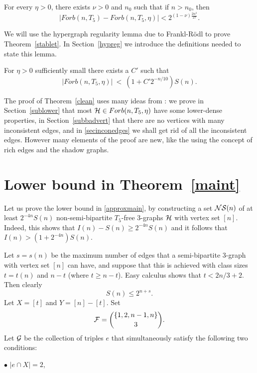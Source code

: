 \documentclass[11pt]{article}
\begin{document}
\begin{theorem} \label{stablet}
For every $\eta>0$, there exists $\nu>0$ and $n_0$ such that
 if $n>n_0$, then $$|Forb(n,T_5) - Forb(n, T_5, \eta)|<2^{(1-\nu)\frac{2n^3}{27}}.$$
\end{theorem}

 We will use the hypergraph regularity lemma due
to Frankl-R\"odl to prove Theorem~\ref{stablet}. In
Section~\ref{hypreg} we introduce the definitions needed to state
this lemma.

\begin{theorem} \label{clean}
For $\eta>0$ sufficiently small there exists a $C'$ such that
\begin{equation}\label{cleanin}|Forb(n, T_5, \eta)|\ <\ (1+C'2^{-n/10}) S(n).\end{equation}
\end{theorem}

The proof of Theorem~\ref{clean} uses many ideas from
\cite{BBS1,BBS2}: we prove in Section~\ref{sublower}  that most $\mathcal{H}\in Forb(n,
T_5, \eta)$ have some lower-dense properties, in Section~\ref{subbadvert} that
there are no vertices with many inconsistent edges, and in \ref{secinconedges} we
shall get rid of  all the inconsistent edges. However many elements
of the proof are new, like the using the concept of rich
 edges and the shadow graphs.



\section{Lower bound in Theorem~\ref{maint}}\label{lower}

Let us prove the lower bound in \eqref{approxmain},  by constructing a set $\mathcal{N}\mathcal{S}(n)$ of at least $2^{-4n}S(n)$ non-semi-bipartite
$T_5$-free 3-graphs $\mathcal{H}$ with vertex set $[n]$.  Indeed, this shows that $I(n)-S(n) \ge 2^{-4n}S(n)$ and it follows that $I(n)>(1+2^{-4n})S(n)$.

  Let $s=s(n)$ be the maximum number of
edges that a semi-bipartite 3-graph with vertex set $[n]$ can have, and suppose that this is achieved with class sizes
$t=t(n)$ and $n-t$ (where $t \ge n-t$). Easy calculus shows that $t<2n/3 +2$. Then clearly $$S(n)\le 2^{n+s}.$$
 Let $X=[t]$ and $Y= [n]-[t]$. Set
$${\cal F}= {\{1,2,n-1, n\}\choose 3}.$$
Let $\cal G$ be the collection of triples $e$ that simultaneously satisfy the following two conditions:

$\bullet$ $|e \cap X|=2$,
\end{document}
